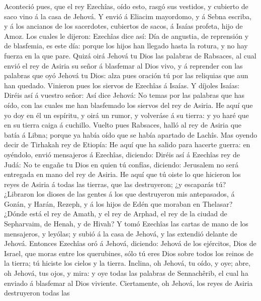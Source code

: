  Aconteció pues, que el rey Ezechîas, oído esto, rasgó sus
vestidos, y cubierto de saco vino á la casa de Jehová.  Y
envió á Eliacim mayordomo, y á Sebna escriba, y á los ancianos de los
sacerdotes, cubiertos de sacos, á Isaías profeta, hijo de Amoz.
 Los cuales le dijeron: Ezechîas dice así: Día de
angustia, de reprensión y de blasfemia, es este día: porque los hijos
han llegado hasta la rotura, y no hay fuerza en la que pare.
 Quizá oirá Jehová tu Dios las palabras de Rabsaces, al
cual envió el rey de Asiria su señor á blasfemar al Dios vivo, y á
reprender con las palabras que oyó Jehová tu Dios: alza pues oración tú
por las reliquias que aun han quedado.  Vinieron pues los
siervos de Ezechîas á Isaías.  Y díjoles Isaías: Diréis
así á vuestro señor: Así dice Jehová: No temas por las palabras que has
oído, con las cuales me han blasfemado los siervos del rey de Asiria.
 He aquí que yo doy en él un espíritu, y oirá un rumor, y
volveráse á su tierra: y yo haré que en su tierra caiga á cuchillo.
 Vuelto pues Rabsaces, halló al rey de Asiria que batía á
Libna; porque ya había oído que se había apartado de Lachîs.
 Mas oyendo decir de Tirhakah rey de Etiopía: He aquí que
ha salido para hacerte guerra: en oyéndolo, envió mensajeros á Ezechîas,
diciendo:  Diréis así á Ezechîas rey de Judá: No te
engañe tu Dios en quien tú confías, diciendo: Jerusalem no será
entregada en mano del rey de Asiria.  He aquí que tú
oiste lo que hicieron los reyes de Asiria á todas las tierras, que las
destruyeron; ¿y escaparás tú?  ¿Libraron los dioses de
las gentes á los que destruyeron mis antepasados, á Gozán, y Harán,
Rezeph, y á los hijos de Edén que moraban en Thelasar? 
¿Dónde está el rey de Amath, y el rey de Arphad, el rey de la ciudad de
Sepharvaim, de Henah, y de Hivah?  Y tomó Ezechîas las
cartas de mano de los mensajeros, y leyólas; y subió á la casa de
Jehová, y las extendió delante de Jehová.  Entonces
Ezechîas oró á Jehová, diciendo:  Jehová de los
ejércitos, Dios de Israel, que moras entre los querubines, sólo tú eres
Dios sobre todos los reinos de la tierra; tú hiciste los cielos y la
tierra.  Inclina, oh Jehová, tu oído, y oye; abre, oh
Jehová, tus ojos, y mira: y oye todas las palabras de Sennachêrib, el
cual ha enviado á blasfemar al Dios viviente. 
Ciertamente, oh Jehová, los reyes de Asiria destruyeron todas las
